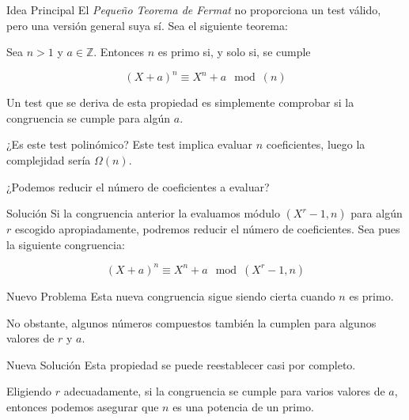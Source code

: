 \documentclass{beamer}
\begin{document}
\begin{frame}{Idea Principal}
	\onslide<1->El \textit{Pequeño Teorema de Fermat} no proporciona un test válido, pero una versión general suya sí. Sea el siguiente teorema:\break
	
	\begin{theorem}
		Sea $n > 1$ y $a \in \mathbb{Z}$. Entonces $n$ es primo si, y solo si, se cumple
		
		\begin{equation*}
		(X + a)^n \equiv X^n + a \mod(n)
		\end{equation*}
	\end{theorem}
	
	Un test que se deriva de esta propiedad es simplemente comprobar si la congruencia se cumple para algún $a$.
\end{frame}

\begin{frame}{¿Es este test polinómico?}
	\onslide<1->Este test implica evaluar $n$ coeficientes, luego la complejidad sería $\Omega(n)$.\break
	
	¿Podemos reducir el número de coeficientes a evaluar?
\end{frame}

\begin{frame}{Solución}
	\onslide<1->Si la congruencia anterior la evaluamos módulo $(X^r - 1, n)$ para algún $r$ escogido apropiadamente, podremos reducir el número de coeficientes. Sea pues la siguiente congruencia:\break
	
	\begin{equation*}
	(X + a)^n \equiv X^n + a \mod(X^r - 1, n)
	\end{equation*}
\end{frame}

\begin{frame}{Nuevo Problema}
	\onslide<1->Esta nueva congruencia sigue siendo cierta cuando $n$ es primo.\break
	
	No obstante, algunos números compuestos también la cumplen para algunos valores de $r$ y $a$.
\end{frame}

\begin{frame}{Nueva Solución}
	\onslide<1->Esta propiedad se puede reestablecer casi por completo.\break
	
	Eligiendo $r$ adecuadamente, si la congruencia se cumple para varios valores de $a$, entonces podemos asegurar que $n$ es una potencia de un primo.
\end{frame}
\end{document}
